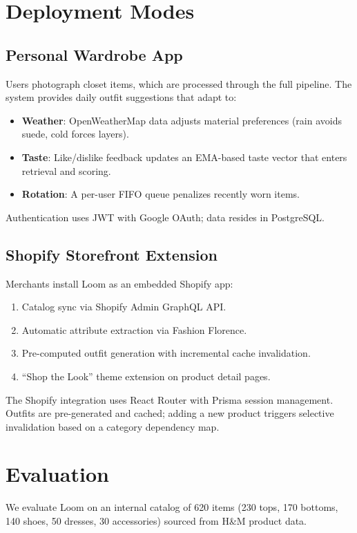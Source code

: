 \documentclass[sigconf]{acmart}
\begin{document}
\section{Deployment Modes}

\subsection{Personal Wardrobe App}

Users photograph closet items, which are processed through the full
pipeline.  The system provides daily outfit suggestions that adapt to:
\begin{itemize}
\item \textbf{Weather}: OpenWeatherMap data adjusts material preferences
  (rain avoids suede, cold forces layers).
\item \textbf{Taste}: Like/dislike feedback updates an EMA-based taste
  vector that enters retrieval and scoring.
\item \textbf{Rotation}: A per-user FIFO queue penalizes recently worn
  items.
\end{itemize}
Authentication uses JWT with Google OAuth; data resides in PostgreSQL.

\subsection{Shopify Storefront Extension}

Merchants install Loom as an embedded Shopify app:
\begin{enumerate}
\item Catalog sync via Shopify Admin GraphQL API.
\item Automatic attribute extraction via Fashion Florence.
\item Pre-computed outfit generation with incremental cache invalidation.
\item ``Shop the Look'' theme extension on product detail pages.
\end{enumerate}

The Shopify integration uses React Router with Prisma session management.
Outfits are pre-generated and cached; adding a new product triggers
selective invalidation based on a category dependency map.

\section{Evaluation}

We evaluate Loom on an internal catalog of 620 items (230 tops, 170
bottoms, 140 shoes, 50 dresses, 30 accessories) sourced from H\&M
product data.
\end{document}
